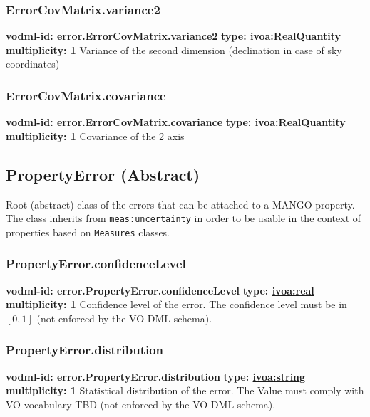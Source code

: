     \subsubsection{ErrorCovMatrix.variance2}
    \textbf{vodml-id: error.ErrorCovMatrix.variance2} \newline
    \textbf{type: \hyperref[sect:ivoa]{ivoa:RealQuantity}} \newline
    \textbf{multiplicity: 1} \newline
    Variance of the second dimension (declination in case of sky coordinates)

    \subsubsection{ErrorCovMatrix.covariance}
    \textbf{vodml-id: error.ErrorCovMatrix.covariance} \newline
    \textbf{type: \hyperref[sect:ivoa]{ivoa:RealQuantity}} \newline
    \textbf{multiplicity: 1} \newline
    Covariance of the 2 axis

  \subsection{PropertyError (Abstract)}
    \label{sect:error.PropertyError}
    Root (abstract) class of the errors that can be attached to a MANGO property. The class inherits from \texttt{meas:uncertainty} in order to be usable in the context of properties based on \texttt{Measures} classes.

    \subsubsection{PropertyError.confidenceLevel}
    \textbf{vodml-id: error.PropertyError.confidenceLevel} \newline
    \textbf{type: \hyperref[sect:ivoa]{ivoa:real}} \newline
    \textbf{multiplicity: 1} \newline
    Confidence level of the error. The confidence level must be in $[0, 1]$ (not enforced by the VO-DML schema).

    \subsubsection{PropertyError.distribution}
    \textbf{vodml-id: error.PropertyError.distribution} \newline
    \textbf{type: \hyperref[sect:ivoa]{ivoa:string}} \newline
    \textbf{multiplicity: 1} \newline
    Statistical distribution of the error. The Value must comply with VO vocabulary TBD (not enforced by the VO-DML schema).

